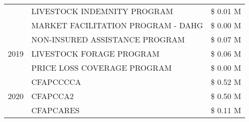 \begin{tabular}{llr}
 & LIVESTOCK INDEMNITY PROGRAM & \$ 0.01 M \\
 & MARKET FACILITATION PROGRAM - DAHG & \$ 0.00 M \\
\cline{1-3}
\multirow[t]{3}{*}{2019} & NON-INSURED ASSISTANCE PROGRAM & \$ 0.07 M \\
 & LIVESTOCK FORAGE PROGRAM & \$ 0.06 M \\
 & PRICE LOSS COVERAGE PROGRAM & \$ 0.00 M \\
\cline{1-3}
\multirow[t]{3}{*}{2020} & CFAPCCCCA & \$ 0.52 M \\
 & CFAPCCA2 & \$ 0.50 M \\
 & CFAPCARES & \$ 0.11 M \\
\cline{1-3}
\bottomrule
\end{tabular}
